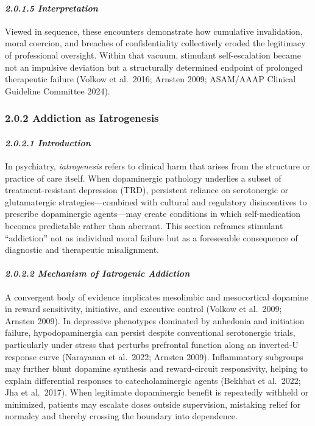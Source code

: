 \paragraph{\texorpdfstring{\emph{2.0.1.5 Interpretation}}{2.0.1.5 Interpretation}}\label{10b_traad-interpretation-1}

Viewed in sequence, these encounters demonstrate how cumulative invalidation, moral coercion, and breaches of confidentiality collectively eroded the legitimacy of professional oversight. Within that vacuum, stimulant self-escalation became not an impulsive deviation but a structurally determined endpoint of prolonged therapeutic failure (Volkow et al.~2016; Arnsten 2009; ASAM/AAAP Clinical Guideline Committee 2024).

\subsubsection{2.0.2 Addiction as Iatrogenesis}\label{10b_traad-addiction-as-iatrogenesis}

\paragraph{\texorpdfstring{\emph{2.0.2.1 Introduction}}{2.0.2.1 Introduction}}\label{10b_traad-introduction-1}

In psychiatry, \emph{iatrogenesis} refers to clinical harm that arises from the structure or practice of care itself. When dopaminergic pathology underlies a subset of treatment-resistant depression (TRD), persistent reliance on serotonergic or glutamatergic strategies---combined with cultural and regulatory disincentives to prescribe dopaminergic agents---may create conditions in which self-medication becomes predictable rather than aberrant. This section reframes stimulant ``addiction'' not as individual moral failure but as a foreseeable consequence of diagnostic and therapeutic misalignment.

\paragraph{\texorpdfstring{\emph{2.0.2.2 Mechanism of Iatrogenic Addiction}}{2.0.2.2 Mechanism of Iatrogenic Addiction}}\label{10b_traad-mechanism-of-iatrogenic-addiction}

A convergent body of evidence implicates mesolimbic and mesocortical dopamine in reward sensitivity, initiative, and executive control (Volkow et al.~2009; Arnsten 2009). In depressive phenotypes dominated by anhedonia and initiation failure, hypodopaminergia can persist despite conventional serotonergic trials, particularly under stress that perturbs prefrontal function along an inverted-U response curve (Narayanan et al.~2022; Arnsten 2009). Inflammatory subgroups may further blunt dopamine synthesis and reward-circuit responsivity, helping to explain differential responses to catecholaminergic agents (Bekhbat et al.~2022; Jha et al.~2017). When legitimate dopaminergic benefit is repeatedly withheld or minimized, patients may escalate doses outside supervision, mistaking relief for normalcy and thereby crossing the boundary into dependence.

